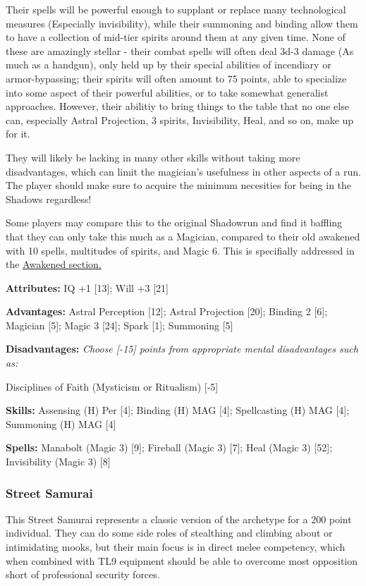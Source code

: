 \begin{multicols}{2}
	Their spells will be powerful enough to supplant or replace many technological measures (Especially invisibility), while their summoning and binding allow them to have a collection of mid-tier spirits around them at any given time. None of these are amazingly stellar - their combat spells will often deal 3d-3 damage (As much as a handgun), only held up by their special abilities of incendiary or armor-bypassing; their spirits will often amount to 75 points, able to specialize into some aspect of their powerful abilities, or to take somewhat generalist approaches. However, their abilitiy to bring things to the table that no one else can, especially Astral Projection, 3 spirits, Invisibility, Heal, and so on, make up for it.
	
	They will likely be lacking in many other skills without taking more disadvantages, which can limit the magician's usefulness in other aspects of a run. The player should make sure to acquire the minimum necesities for being in the Shadows regardless!
	
	Some players may compare this to the original Shadowrun and find it baffling that they can only take this much as a Magician, compared to their old awakened with 10 spells, multitudes of spirits, and Magic 6. This is specifially addressed in the \hyperref[gurps_awakened]{\GURPS Awakened section.}
	
	\textbf{Attributes: } IQ +1 [13]; Will +3 [21]
	
	\textbf{Advantages: } Astral Perception [12]; Astral Projection [20]; Binding 2 [6]; Magician [5]; Magic 3 [24]; Spark [1]; Summoning [5]
	
	\textbf{Disadvantages: } \textit{Choose [-15] points from appropriate mental disadvantages such as:}
	
	Disciplines of Faith (Mysticism or Ritualism) [-5]
	
	\textbf{Skills: } Assensing (H) Per [4]; Binding (H) MAG [4]; Spellcasting (H) MAG [4]; Summoning (H) MAG [4]
	
	\textbf{Spells: } Manabolt (Magic 3) [9]; Fireball (Magic 3) [7]; Heal (Magic 3) [52]; Invisibility (Magic 3) [8]
	
	
	\subsubsection{Street Samurai}
	
	This Street Samurai represents a classic version of the archetype for a 200 point individual. They can do some side roles of stealthing and climbing about or intimidating mooks, but their main focus is in direct melee competency, which when combined with TL9 equipment should be able to overcome most opposition short of professional security forces.
	

\end{multicols}

